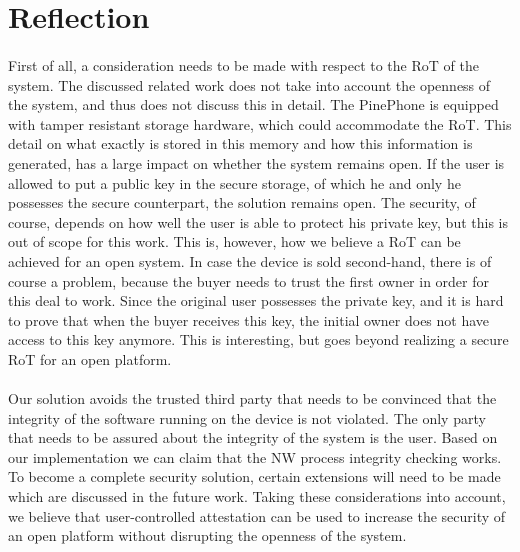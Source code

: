 \section{Reflection}

\paragraph*{}
First of all, a consideration needs to be made with respect to the RoT of the system. The discussed related work does not take into account the openness of the system, and thus does not discuss this in detail. The PinePhone is equipped with tamper resistant storage hardware, which could accommodate the RoT. This detail on what exactly is stored in this memory and how this information is generated, has a large impact on whether the system remains open. If the user is allowed to put a public key in the secure storage, of which he and only he possesses the secure counterpart, the solution remains open. The security, of course, depends on how well the user is able to protect his private key, but this is out of scope for this work. This is, however, how we believe a RoT can be achieved for an open system. In case the device is sold second-hand, there is of course a problem, because the buyer needs to trust the first owner in order for this deal to work. Since the original user possesses the private key, and it is hard to prove that when the buyer receives this key, the initial owner does not have access to this key anymore. This is interesting, but goes beyond realizing a secure RoT for an open platform.

\paragraph*{}
Our solution avoids the trusted third party that needs to be convinced that the integrity of the software running on the device is not violated. The only party that needs to be assured about the integrity of the system is the user. Based on our implementation we can claim that the NW process integrity checking works. To become a complete security solution, certain extensions will need to be made which are discussed in the future work. Taking these considerations into account, we believe that user-controlled attestation can be used to increase the security of an open platform without disrupting the openness of the system.

